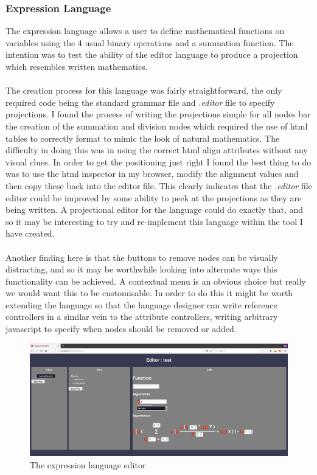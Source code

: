 \documentclass{article}
\begin{document}
\subsubsection{Expression Language}
The expression language allows a user to define mathematical functions on variables using the 4 usual binary operations and a summation function. The intention was to test the ability of the editor language to produce a projection which resembles written mathematics.
\\
\\
The creation process for this language was fairly straightforward, the only required code being the standard grammar file and \emph{.editor} file to specify projections. I found the process of writing the projections simple for all nodes bar the creation  of the summation and division nodes which required the use of html tables to correctly format to mimic the look of natural mathematics. The difficulty in doing this was in using the correct html align attributes without any visual clues. In order to get the positioning just right I found the best thing to do was to use the html inspector in my browser, modify the alignment values and then copy these back into the editor file. This clearly indicates that the \emph{.editor} file editor could be improved by some ability to peek at the projections as they are being written. A projectional editor for the language could do exactly that, and so it may be interesting to try and re-implement this language within the tool I have created.   
\\
\\
Another finding here is that the buttons to remove nodes can be visually distracting, and so it may be worthwhile looking into alternate ways this functionality can be achieved. A contextual menu is an obvious choice but really we would want this to be customisable. In order to do this it might be worth extending the language so that the language designer can write reference controllers in a similar vein to the attribute controllers, writing arbitrary javascript to specify when nodes should be removed or added.
\begin{figure}[h!]
  \centering
  \includegraphics[width=\linewidth]{./Screenshots/arithmeticUI.png}
  \caption{The expression language editor}
  \label{fig:arithmeticUI}
\end{figure}
\end{document}
